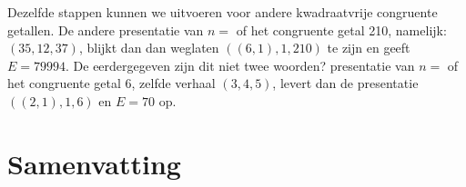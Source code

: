 \documentclass[12pt,reqno]{article}
\theoremstyle{theorem}
\theoremstyle{definition}
\begin{document}
	Dezelfde stappen kunnen we uitvoeren voor andere kwadraatvrije congruente getallen. De andere presentatie van {\color{red}$n=$ of het congruente getal} 210, {\color{red}namelijk:} $(35,12,37)$, blijkt dan {\color{red}dan weglaten} $((6,1),1,210)$ te zijn en geeft $E = 79994$. De eerdergegeven {\color{red}zijn dit niet twee woorden?} presentatie van {\color{red}$n=$ of het congruente getal} 6, {\color{red}zelfde verhaal} $(3,4,5)$, levert dan {\color{red}de presentatie} $((2,1),1,6)$ en $E = 70$ op.
	
	
	\section{Samenvatting}
	
	
	
	
\end{document}
